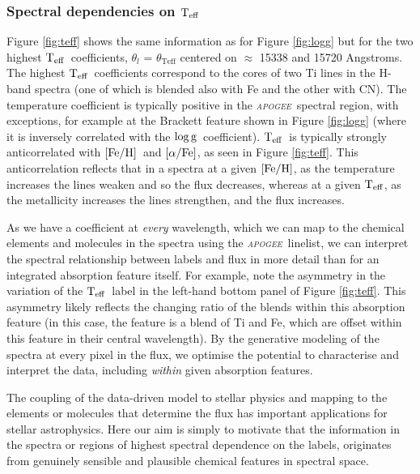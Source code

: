\documentclass[12pt, preprint]{aastex}
\newcommand{\project}[1]{\textsl{#1}}
\newcommand{\apogee}{\project{\textsc{apogee}}}
\newcommand{\teff}{\mbox{$\rm T_{eff}$}}
\newcommand{\feh}{\mbox{$\rm [Fe/H]$}}
\newcommand{\alphafe}{\mbox{$\rm [\alpha/Fe]$}}
\newcommand{\logg}{\mbox{$\rm \log g$}}
\begin{document}
\subsubsection{Spectral dependencies on \teff} 

Figure \ref{fig:teff} shows the same information as for Figure \ref{fig:logg} but for the two highest \teff\ coefficients, $\theta_l$ = $\theta_{\mbox{Teff}}$ centered on $\approx$ 15338 and 15720 Angstroms. The highest \teff\ coefficients correspond to the cores of two Ti lines in the H-band spectra (one of which is blended also with Fe and the other with CN). The temperature coefficient is typically positive in the \apogee\ spectral region, with exceptions, for example at the Brackett feature shown in Figure \ref{fig:logg} (where it is inversely correlated with the \logg\ coefficient). \teff\ is typically strongly anticorrelated with \feh\ and \alphafe, as seen in Figure \ref{fig:teff}. This anticorrelation reflects that in a spectra at a given \feh, as the temperature increases the lines weaken and so the flux decreases, whereas at a given \teff, as the metallicity increases the lines strengthen, and the flux increases. 

As we have a coefficient at \textit{every} wavelength, which we can map to the chemical elements and molecules in the spectra using the \apogee\ linelist, we can interpret the spectral relationship between labels and flux in more detail than for an integrated absorption feature itself.  For example, note the asymmetry in the variation of the \teff\ label in the left-hand bottom panel of Figure \ref{fig:teff}. This asymmetry likely reflects the changing ratio of the blends within this absorption feature (in this case, the feature is a blend of Ti and Fe, which are offset within this feature in their central wavelength). By the generative modeling of the spectra at every pixel in the flux, we optimise the potential to characterise and interpret the data, including \textit{within} given absorption features. 

The coupling of the data-driven model to stellar physics and mapping to the elements or molecules that determine the flux has important applications for stellar astrophysics. Here our aim is simply to motivate that the information in the spectra or regions of highest spectral dependence on the labels, originates from genuinely sensible and plausible chemical features in spectral space.  
\end{document}
